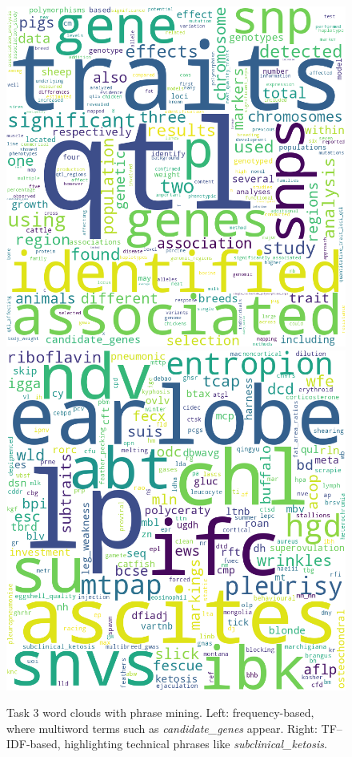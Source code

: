 \documentclass[11pt]{article}
\begin{document}
\begin{figure}[t]
  \centering
  \includegraphics[width=0.48\linewidth]{../outputs/phrased_freq_wordcloud.png} \hfill
  \includegraphics[width=0.48\linewidth]{../outputs/phrased_tfidf_wordcloud.png}
  \caption{Task 3 word clouds with phrase mining. Left: frequency-based, where multiword terms such as 
  \textit{candidate\_genes} appear. Right: TF--IDF-based, highlighting technical phrases like 
  \textit{subclinical\_ketosis}.}
  \label{fig:wc_task3}
\end{figure}
\end{document}
